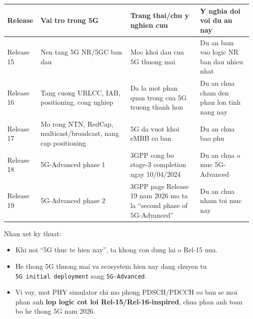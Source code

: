 \documentclass[
  vietnamese,
  a4paper,
  11pt]{article}
\newcounter{none} %
\providecommand{\tightlist}{%
  \setlength{\itemsep}{0pt}\setlength{\parskip}{0pt}}
\begin{document}
{\def\LTcaptype{none} %
\begin{longtable}[]{@{}
  >{\raggedright\arraybackslash}p{}
  >{\raggedright\arraybackslash}p{}
  >{\raggedright\arraybackslash}p{}
  >{\raggedright\arraybackslash}p{}@{}}
\toprule\noalign{}
\begin{minipage}[b]{\linewidth}\raggedright
Release
\end{minipage} & \begin{minipage}[b]{\linewidth}\raggedright
Vai tro trong 5G
\end{minipage} & \begin{minipage}[b]{\linewidth}\raggedright
Trang thai/chu y nghien cuu
\end{minipage} & \begin{minipage}[b]{\linewidth}\raggedright
Y nghia doi voi du an nay
\end{minipage} \\
\midrule\noalign{}
\endhead
\bottomrule\noalign{}
\endlastfoot
Release 15 & Nen tang 5G NR/5GC ban dau & Moc khoi dau cua 5G thuong mai
& Du an bam vao logic NR ban dau nhieu nhat \\
Release 16 & Tang cuong URLCC, IAB, positioning, cong nghiep & Da la mot
phan quan trong cua 5G truong thanh hon & Du an chua cham den phan lon
tinh nang nay \\
Release 17 & Mo rong NTN, RedCap, multicast/broadcast, nang cap
positioning & 5G da vuot khoi eMBB co ban & Du an chua bao phu \\
Release 18 & 5G-Advanced phase 1 & 3GPP cong bo stage-3 completion ngay
10/04/2024 & Du an chua o muc 5G-Advanced \\
Release 19 & 5G-Advanced phase 2 & 3GPP page Release 19 nam 2026 mo ta
la ``second phase of 5G-Advanced'' & Du an chua nham toi muc nay \\
\end{longtable}
}

Nhan xet ky thuat:

\begin{itemize}
\tightlist
\item
  Khi noi ``5G thuc te hien nay'', ta khong con dung lai o Rel-15 nua.
\item
  He thong 5G thuong mai va ecosystem hien nay dang chuyen tu
  \texttt{5G\ initial\ deployment} sang \texttt{5G-Advanced}.
\item
  Vi vay, mot PHY simulator chi mo phong PDSCH/PDCCH co ban se moi phan
  anh \textbf{lop logic cot loi Rel-15/Rel-16-inspired}, chua phan anh
  toan bo he thong 5G nam 2026.
\end{itemize}
\end{document}
